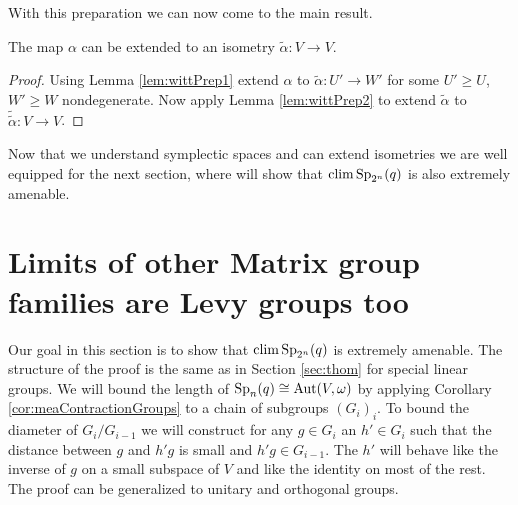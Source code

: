 With this preparation we can now come to the main result.
\begin{corollary}\label{lem:witt}
The map $\alpha$ can be extended to an isometry $\tilde{\alpha}\colon V\to V$.
\end{corollary}
\begin{proof}
Using Lemma \ref{lem:wittPrep1} extend $\alpha$ to $\tilde{\alpha}\colon U'\to W'$ for some $U'\geq U$, $W'\geq W$ nondegenerate. Now apply Lemma \ref{lem:wittPrep2} to extend $\tilde{\alpha}$ to $\tilde{\tilde{\alpha}}\colon V\to V$.
\end{proof}

Now that we understand symplectic spaces and can extend isometries we are well equipped for the next section, where will show that $\operatorname{clim} \operatorname{Sp}_{2^n}(q)$ is also extremely amenable.


\section{Limits of other Matrix group families are Levy groups too}


Our goal in this section is to show that $\operatorname{clim} \operatorname{Sp}_{2^n}(q)$ is extremely amenable. The structure of the proof is the same as in Section \ref{sec:thom} for special linear groups. We will bound the length of $\operatorname{Sp}_n(q)\cong\operatorname{Aut}(V,\omega)$ by applying Corollary \ref{cor:meaContractionGroups} to a chain of subgroups $(G_i)_i$. To bound the diameter of $G_i/G_{i-1}$ we will construct for any $g\in G_i$ an $h'\in G_i$ such that the distance between $g$ and $h'g$ is small and $h'g\in G_{i-1}$. The $h'$ will behave like the inverse of $g$ on a small subspace of $V$ and like the identity on most of the rest.    The proof can be generalized to unitary and orthogonal groups.

